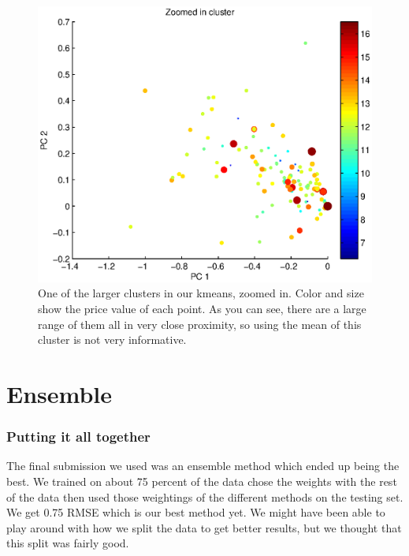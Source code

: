\documentclass[a4paper,10pt]{article}
\begin{document}
\begin{figure}[H]
 \centering
 \includegraphics[scale=0.5]{ZoomedInCluster.eps}
 \caption{One of the larger clusters in our kmeans, zoomed in. Color and size show the price value of each point. As you can see, there are a large range of them all in very
	  close proximity, so using the mean of this cluster is not very informative.}
\end{figure}

\section{Ensemble}
\subsubsection*{Putting it all together}
The final submission we used was an ensemble method which ended up being the best. We trained on about 75 percent of the data chose the weights with the rest of the data then used those weightings of the different methods on the testing set. We get 0.75 RMSE which is our best method yet. We might have been able to play around with how we split the data to get better results, but we thought that this split was fairly good.
\end{document}
